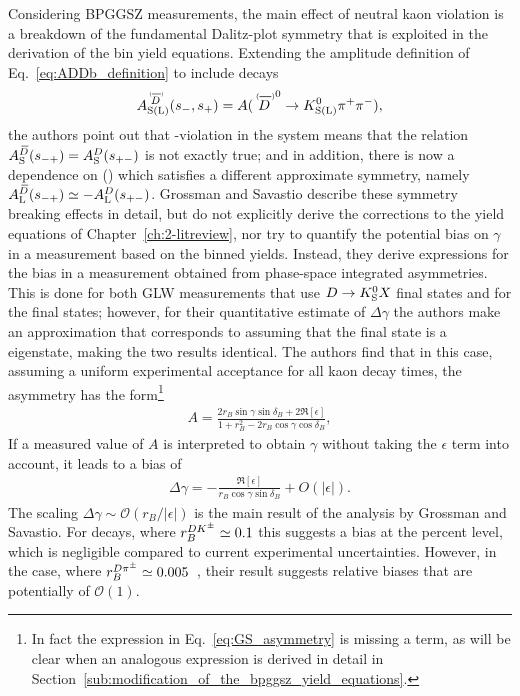 Considering BPGGSZ measurements, the main effect of neutral kaon \CP violation is a breakdown of the fundamental Dalitz-plot symmetry that is exploited in the derivation of the bin yield equations. Extending the amplitude definition of Eq.~\eqref{eq:ADDb_definition} to include \KL decays
\begin{align}\label{eq:ADDb_definition_with_KL}
\ADorDbSL (\smpLong)= A(\DorDbar^0\to K^0_\text{S(L)} \pi^+\pi^-),
\end{align}
the authors point out that \CP-violation in the \KS system means that the relation $A_{\rm S}^{{\kern 0.18em\overline{\kern -0.18em D}}}(s_{-+})=A_{\rm S}^{D}(s_{+-})$ is not exactly true; and in addition, there is now a dependence on \ADL(\smp) which satisfies a different approximate symmetry, namely ${A_{\rm L}^{{\kern 0.18em\overline{\kern -0.18em D}}}(s_{-+}) \simeq -A_{\rm L}^{D}(s_{+-})}$. Grossman and Savastio describe these symmetry breaking effects in detail, but do not explicitly derive the corrections to the yield equations of Chapter~\ref{ch:2-litreview}, nor try to quantify the potential bias on $\gamma$ in a measurement based on the binned yields. Instead, they derive expressions for the bias in a measurement obtained from phase-space integrated \CP asymmetries. This is done for both GLW measurements that use ${D}\rightarrow{\ensuremath{{K}^0_{\mathrm{S}}}} X$ final states and for the \DtoKshh final states; however, for their quantitative estimate of $\Delta \gamma$ the authors make an approximation that corresponds to assuming that the \DtoKshh final state is a \CP eigenstate, making the two results identical. The authors find that in this case, assuming a uniform experimental acceptance for all kaon decay times, the asymmetry has the form\footnote{In fact the expression in Eq.~\eqref{eq:GS_asymmetry} is missing a term, as will be clear when an analogous expression is derived in detail in Section~\ref{sub:modification_of_the_bpggsz_yield_equations}.}
\begin{align}\label{eq:GS_asymmetry}
    A = \frac{2r_B\sin \gamma \sin \delta_B + 2 \Re [\epsilon]}{1+r_B^2-2r_B\cos \gamma \cos \delta_B},
\end{align}
If a measured value of $A$ is interpreted to obtain $\gamma$ without taking the $\epsilon$ term into account, it leads to a bias of
\begin{align}
    \Delta \gamma = -\frac{\Re [\epsilon]}{r_B \cos \gamma \sin \delta_B} + O(|\epsilon|).
\end{align}
The scaling $\Delta\gamma\sim\mathcal O(r_B/|\epsilon|)$ is the main result of the analysis by Grossman and Savastio. For \BtoDK decays, where $r_B^{{{D}{{K}^\pm}}}\simeq 0.1$ this suggests a bias at the percent level, which is negligible compared to current experimental uncertainties. However, in the \BtoDpi case, where $r_B^{D\pi^\pm}\simeq 0.005$~\cite{kenzieEstimatingEnsuremathPi2016}, their result suggests relative biases that are potentially of $\mathcal O (1)$.


